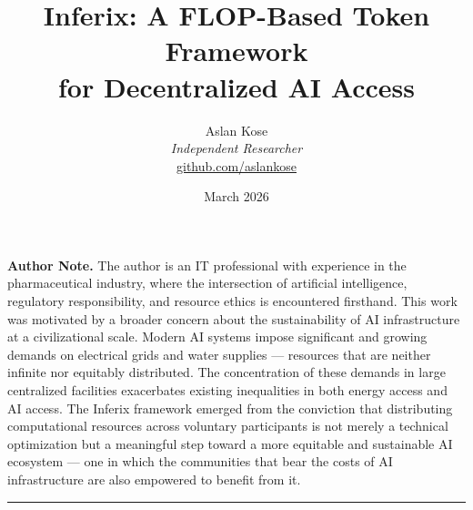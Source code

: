 \documentclass[12pt]{article}
\begin{document}
\title{
    \vspace{-1cm}
    \Large\textbf{Inferix: A FLOP-Based Token Framework\\
    for Decentralized AI Access}\\[0.5em]
    \normalsize
}

\author{
    Aslan Kose\\
    \textit{Independent Researcher}\\
    \href{https://github.com/aslankose}{github.com/aslankose}
}

\date{March 2026}

\maketitle
\thispagestyle{fancy}

\begin{center}
\small
\parbox{0.85\textwidth}{
\textbf{Author Note.}
The author is an IT professional with experience in the pharmaceutical industry, where the intersection of artificial intelligence, regulatory responsibility, and resource ethics is encountered firsthand. This work was motivated by a broader concern about the sustainability of AI infrastructure at a civilizational scale. Modern AI systems impose significant and growing demands on electrical grids and water supplies — resources that are neither infinite nor equitably distributed. The concentration of these demands in large centralized facilities exacerbates existing inequalities in both energy access and AI access. The Inferix framework emerged from the conviction that distributing computational resources across voluntary participants is not merely a technical optimization but a meaningful step toward a more equitable and sustainable AI ecosystem — one in which the communities that bear the costs of AI infrastructure are also empowered to benefit from it.
}
\end{center}

\vspace{1em}
\hrule
\vspace{1em}
\end{document}
